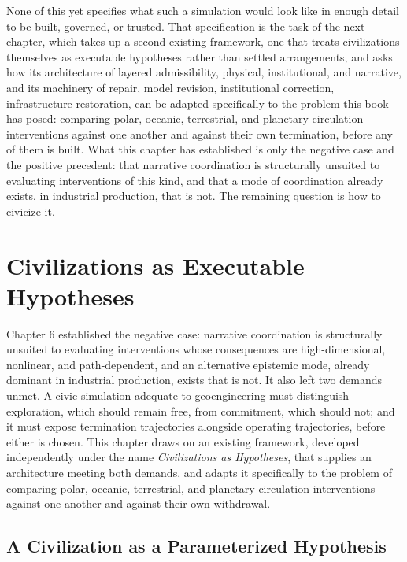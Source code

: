 \documentclass[11pt,oneside]{book}
\begin{document}
None of this yet specifies what such a simulation would look like in enough detail to be built, governed, or trusted. That specification is the task of the next chapter, which takes up a second existing framework, one that treats civilizations themselves as executable hypotheses rather than settled arrangements, and asks how its architecture of layered admissibility, physical, institutional, and narrative, and its machinery of repair, model revision, institutional correction, infrastructure restoration, can be adapted specifically to the problem this book has posed: comparing polar, oceanic, terrestrial, and planetary-circulation interventions against one another and against their own termination, before any of them is built. What this chapter has established is only the negative case and the positive precedent: that narrative coordination is structurally unsuited to evaluating interventions of this kind, and that a mode of coordination already exists, in industrial production, that is not. The remaining question is how to civicize it.

\chapter{Civilizations as Executable Hypotheses}

Chapter 6 established the negative case: narrative coordination is structurally unsuited to evaluating interventions whose consequences are high-dimensional, nonlinear, and path-dependent, and an alternative epistemic mode, already dominant in industrial production, exists that is not. It also left two demands unmet. A civic simulation adequate to geoengineering must distinguish exploration, which should remain free, from commitment, which should not; and it must expose termination trajectories alongside operating trajectories, before either is chosen. This chapter draws on an existing framework, developed independently under the name \emph{Civilizations as Hypotheses}, that supplies an architecture meeting both demands, and adapts it specifically to the problem of comparing polar, oceanic, terrestrial, and planetary-circulation interventions against one another and against their own withdrawal.

\section*{A Civilization as a Parameterized Hypothesis}
\end{document}
